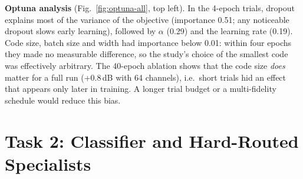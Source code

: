 \documentclass[conference]{IEEEtran}
\begin{document}
\textbf{Optuna analysis} (Fig.~\ref{fig:optuna-all}, top left). In the 4-epoch trials, dropout explains most of the variance
of the objective (importance 0.51; any noticeable dropout slows early learning), followed by $\alpha$ (0.29) and the
learning rate (0.19). Code size, batch size and width had importance below 0.01: within four epochs they made no
measurable difference, so the study's choice of the smallest code was effectively arbitrary. The 40-epoch ablation
shows that the code size \emph{does} matter for a full run (+0.8\,dB with 64 channels), i.e.\ short trials hid an
effect that appears only later in training. A longer trial budget or a multi-fidelity schedule would reduce this
bias.

\clearpage
\section{Task 2: Classifier and Hard-Routed Specialists}\label{sec:t2}
\end{document}
